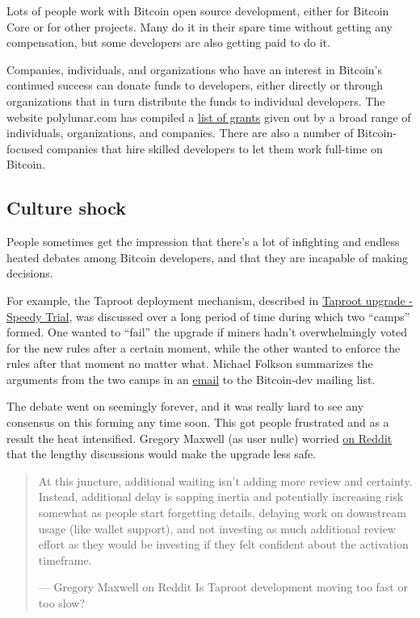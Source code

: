Lots of people work with Bitcoin open source development, either for
Bitcoin Core or for other projects. Many do it in their spare time
without getting any compensation, but some developers are also getting
paid to do it.

Companies, individuals, and organizations who have an interest in
Bitcoin's continued success can donate funds to developers, either
directly or through organizations that in turn distribute the funds to
individual developers. The website polylunar.com has compiled a
\href{https://polylunar.com/bitcoin-grants-tracker/}{list of grants}
given out by a broad range of individuals, organizations, and companies.
There are also a number of Bitcoin-focused companies that hire skilled
developers to let them work full-time on Bitcoin.

\hypertarget{_culture_shock}{%
\subsection{Culture shock}\label{_culture_shock}}

People sometimes get the impression that there's a lot of infighting and
endless heated debates among Bitcoin developers, and that they are
incapable of making decisions.

For example, the Taproot deployment mechanism, described in
\protect\hyperlink{taproot-deployment}{Taproot upgrade - Speedy Trial},
was discussed over a long period of time during which two ``camps''
formed. One wanted to ``fail'' the upgrade if miners hadn't
overwhelmingly voted for the new rules after a certain moment, while the
other wanted to enforce the rules after that moment no matter what.
Michael Folkson summarizes the arguments from the two camps in an
\href{https://lists.linuxfoundation.org/pipermail/bitcoin-dev/2021-February/018380.html}{email}
to the Bitcoin-dev mailing list.

The debate went on seemingly forever, and it was really hard to see any
consensus on this forming any time soon. This got people frustrated and
as a result the heat intensified. Gregory Maxwell (as user nullc)
worried
\href{https://www.reddit.com/r/Bitcoin/comments/hrlpnc/technical_taproot_why_activate/fyqbn8s/?utm_source=share\&utm_medium=web2x\&context=3}{on
Reddit} that the lengthy discussions would make the upgrade less safe.

\begin{quote}
At this juncture, additional waiting isn't adding more review and
certainty. Instead, additional delay is sapping inertia and potentially
increasing risk somewhat as people start forgetting details, delaying
work on downstream usage (like wallet support), and not investing as
much additional review effort as they would be investing if they felt
confident about the activation timeframe.

---  Gregory Maxwell on Reddit Is Taproot development moving too fast or
too slow?
\end{quote}

